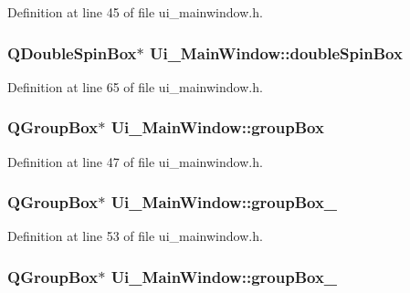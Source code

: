 Definition at line 45 of file ui\-\_\-mainwindow.\-h.

\hypertarget{class_ui___main_window_abb8358aecbdaaab56cfae1ac221c1659}{
\subsubsection[{double\-Spin\-Box}]{\setlength{\rightskip}{0pt plus 5cm}Q\-Double\-Spin\-Box$\ast$ Ui\-\_\-\-Main\-Window\-::double\-Spin\-Box}}\label{class_ui___main_window_abb8358aecbdaaab56cfae1ac221c1659}


Definition at line 65 of file ui\-\_\-mainwindow.\-h.

\hypertarget{class_ui___main_window_aef7cb3be8cecfc9aaf98f036a98781ce}{
\subsubsection[{group\-Box}]{\setlength{\rightskip}{0pt plus 5cm}Q\-Group\-Box$\ast$ Ui\-\_\-\-Main\-Window\-::group\-Box}}\label{class_ui___main_window_aef7cb3be8cecfc9aaf98f036a98781ce}


Definition at line 47 of file ui\-\_\-mainwindow.\-h.

\hypertarget{class_ui___main_window_abb28acde35ffce4d0e6152579df2cbc3}{
\subsubsection[{group\-Box\-\_\-2}]{\setlength{\rightskip}{0pt plus 5cm}Q\-Group\-Box$\ast$ Ui\-\_\-\-Main\-Window\-::group\-Box\-\_}}\label{class_ui___main_window_abb28acde35ffce4d0e6152579df2cbc3}


Definition at line 53 of file ui\-\_\-mainwindow.\-h.

\hypertarget{class_ui___main_window_a320d3d7ba1cb8fff7b7b95923ed10f5e}{
\subsubsection[{group\-Box\-\_\-3}]{\setlength{\rightskip}{0pt plus 5cm}Q\-Group\-Box$\ast$ Ui\-\_\-\-Main\-Window\-::group\-Box\-\_}}\label{class_ui___main_window_a320d3d7ba1cb8fff7b7b95923ed10f5e}


